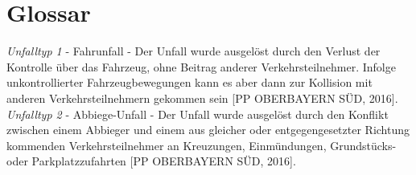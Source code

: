 
 {}
\renewcommand\refname{Glossa} \chapter*{Glossar}

\textit{Unfalltyp 1} - Fahrunfall - Der Unfall wurde ausgelöst durch den Verlust der Kontrolle über das Fahrzeug, ohne Beitrag anderer Verkehrsteilnehmer. Infolge unkontrollierter Fahrzeugbewegungen kann es aber dann zur Kollision mit anderen Verkehrsteilnehmern gekommen sein [PP OBERBAYERN SÜD, 2016].\\

\textit{Unfalltyp 2} - Abbiege-Unfall - Der Unfall wurde ausgelöst durch den Konflikt zwischen einem Abbieger und einem aus gleicher oder entgegengesetzter Richtung kommenden Verkehrsteilnehmer an Kreuzungen, Einmündungen, Grundstücks- oder Parkplatzzufahrten [PP OBERBAYERN SÜD, 2016].\\